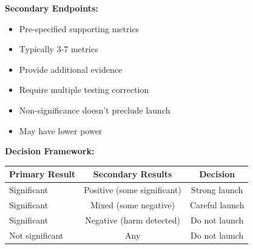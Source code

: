 \textbf{Secondary Endpoints:}

\begin{itemize}
    \item Pre-specified supporting metrics
    \item Typically 3-7 metrics
    \item Provide additional evidence
    \item Require multiple testing correction
    \item Non-significance doesn't preclude launch
    \item May have lower power
\end{itemize}

\textbf{Decision Framework:}

\begin{center}
\begin{tabular}{lcc}
\toprule
Primary Result & Secondary Results & Decision \\
\midrule
Significant & Positive (some significant) & Strong launch \\
Significant & Mixed (some negative) & Careful launch \\
Significant & Negative (harm detected) & Do not launch \\
Not significant & Any & Do not launch \\
\bottomrule
\end{tabular}
\end{center}

